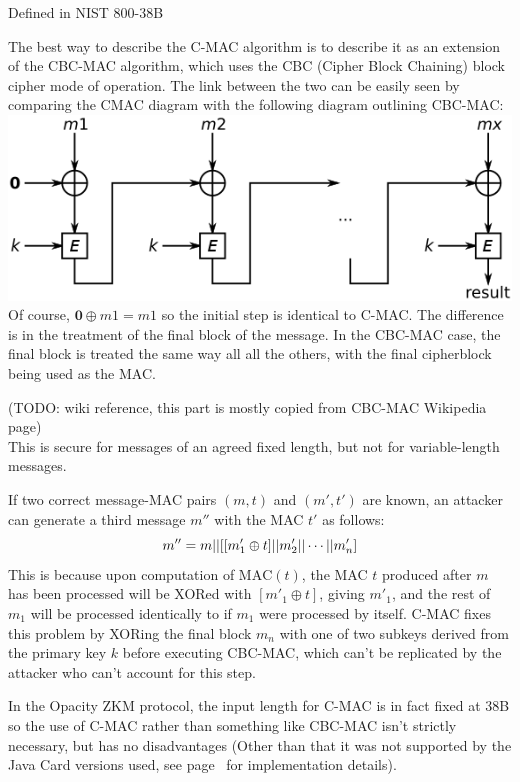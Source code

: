\documentclass[12pt]{article}
\begin{document}
Defined in NIST 800-38B

The best way to describe the C-MAC algorithm is to describe it as an extension of the CBC-MAC algorithm, which uses the CBC (Cipher Block Chaining) block cipher mode of operation. The link between the two can be easily seen by comparing the CMAC diagram with the following diagram outlining CBC-MAC:\\
\includegraphics[scale=0.5]{implementation/CBC-MAC}\\
Of course, $\mathbf{0} \oplus m1=m1$ so the initial step is identical to C-MAC. The difference is in the treatment of the final block of the message. In the CBC-MAC case, the final block is treated the same way all all the others, with the final cipherblock being used as the MAC.

(TODO: wiki reference, this part is mostly copied from CBC-MAC Wikipedia page)\\
This is secure for messages of an agreed fixed length, but not for variable-length messages.

If two correct message-MAC pairs $(m,t)$ and $(m',t')$ are known, an attacker can generate a third message $m''$ with the MAC $t'$ as follows: 
$$m''=m||[[m'_1\oplus t] || m'_2 || \cdots \\ || m'_n]$$
This is because upon computation of $\text{MAC}(t)$, the MAC $t$ produced after $m$ has been processed will be XORed with $[m'_1 \oplus t]$, giving $m'_1$, and the rest of $m_1$ will be processed identically to if $m_1$ were processed by itself. C-MAC fixes this problem by XORing the final block $m_n$ with one of two subkeys derived from the primary key $k$ before executing CBC-MAC, which can't be replicated by the attacker who can't account for this step.

In the Opacity ZKM protocol, the input length for C-MAC is in fact fixed at 38B so the use of C-MAC rather than something like CBC-MAC isn't strictly necessary, but has no disadvantages (Other than that it was not supported by the Java Card versions used, see page~\pageref{cmac_impl} for implementation details).
\end{document}

